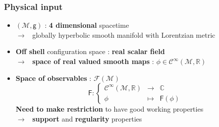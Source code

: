 \documentclass[9pt]{beamer}
\newcommand{\Ccal}{\mathcal{C}}
\newcommand{\Fcal}{\mathcal{F}}
\newcommand{\Mcal}{\mathcal{M}}
\newcommand{\Cbb}{\mathbb{C}}
\newcommand{\Rbb}{\mathbb{R}}
\newcommand{\Fsf}{\mathsf{F}}
\newcommand{\gsf}{\mathsf{g}}
\begin{document}
\begin{frame}[label=input]

\frametitle{Physical input \hfill \hyperlink{details_input}{} \qquad}

\vfill

\begin{itemize}
  
\item $(\Mcal,\gsf)$ : \textbf{4 dimensional} spacetime \\
\vspace*{8pt} $\to$ \ globally hyperbolic smooth manifold with Lorentzian metric \\[2pt]

\vfill

\item \textbf{Off shell} configuration space : \textbf{real scalar field} \\
\vspace*{8pt} $\to$ \ \textbf{space of real valued smooth maps} : $\phi \in \Ccal^\infty(\Mcal,\Rbb)$ \\[2pt]

\vfill

\item \textbf{Space of observables} : $\Fcal(\Mcal)$ 
%
\begin{equation*}
\ \Fsf : \left\{
\begin{array}{ccc}
\Ccal^\infty(\Mcal,\Rbb) & \to & \Cbb \\
\phi & \mapsto & \Fsf(\phi)
\end{array}
\right.
\end{equation*}
%
\textbf{Need to make restriction} to have good working properties\\[2pt]
%
\vspace*{8pt} $\to$ \ \textbf{support} and \textbf{regularity} properties

\end{itemize}

\vfill

\end{frame}  

\end{document}
